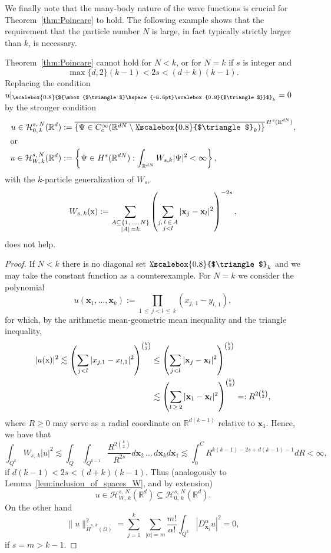 \documentclass[AHL, Unicode, longabstracts, published]{cedram}
\newcommand*\R {\mathbb{R}}
\newcommand\1{{\ensuremath {\mathds 1} }}
\newcommand{\bx}{\mathbf{x}}
\newcommand{\cH}{\mathcal{H}}
\newcommand{\sx}{\textup{x}}
\newcommand{\bDelta}{{\mbox{$\triangle$}\hspace{-8.6pt}\scalebox{0.8}{$\triangle$}}}
\newcommand{\scriptbDelta}{\scalebox{0.8}{$\bDelta$}}
\begin{document}
We finally note that the many-body nature of the wave functions is crucial for Theorem~\ref{thm:Poincare} to hold. The following example shows that the requirement that the particle number $N$ is large, in fact typically strictly larger than $k$, is necessary.

\begin{prop}\label{prop:counterex}
Theorem~\ref{thm:Poincare} cannot hold for $N < k$, or for $N = k$ if $s$ is integer and
\[
\max\{d,2\}(k-1) < 2s < (d+k)(k-1).
\]
Replacing the condition $u\rvert_{\scriptbDelta_k}=0$ by the stronger condition
\begin{align*}
u \in \cH_{0,\,k}^{s,\,N}(\R^d) &:= \overline{\left\{ \Psi \in C_c^\infty(\R^{dN} \setminus \bDelta_k) \right\} }^{\, H^s(\R^{dN})},
\\
\intertext{or}
u \in \cH_{W,\,k}^{s,\,N}(\R^d) &:= \left\{ \Psi \in H^s(\R^{dN}): \int_{\R^{dN}} W_{s,k} |\Psi|^2 < \infty \right\},
\end{align*}
with the $k$-particle generalization of $W_s$,
\[
W_{s,\,k}(\sx) := \sum_{\substack{A \subseteq \{1,\,\ldots,\,N\}\\|A|\,=k}} \left(\sum_{\substack{j,\,l\:\in\,A\\j<l}} |\bx_j-\bx_l|^2 \right)^{-2s},
\]
does not help.
\end{prop}


\begin{proof}
If $N < k$ there is no diagonal set $\bDelta_k$ and we may take the constant function as a counterexample. For $N = k$ we consider the polynomial
\[
u(\bx_1,\ldots,\bx_k) := \prod_{1\,\le\,j<l\,\le\,k} (x_{j,\,1} - y_{l,\,1}),
\]
for which, by the arithmetic mean-geometric mean inequality and the triangle inequality,
\begin{align*}
|u(\sx)|^2 \lesssim \left(\sum_{j<l} |x_{j,1}-x_{l,1}|^2 \right)^{\binom{k}{2}}
&\le \left(\sum_{j<l} |\bx_j-\bx_l|^2 \right)^{\binom{k}{2}}\\
&\lesssim \left(\sum_{l\,\geq\,2} |\bx_1-\bx_l|^2 \right)^{\binom{k}{2}}=: R^{2\binom{k}{2}},
\end{align*}
where $R \ge 0$ may serve as a radial coordinate on $\R^{d(k-1)}$ relative to $\bx_1$. Hence, we have that
\[
\int_{Q^k} W_{s,\,k} |u|^2
\lesssim \int_Q\,\int_{Q^{k-1}} \frac{R^{2\binom{k}{2}}}{R^{2s}} d\bx_2\,\ldots\,d\bx_k d\bx_1
\lesssim \int_0^C R^{k(k-1)-2s+d(k-1)-1} dR < \infty,
\]
if $d(k-1) < 2s < (d+k)(k-1)$. Thus (analogously to Lemma~\ref{lem:inclusion_of_spaces_W}, and by extension)
\[
u \in \cH_{W,\,k}^{s,\,N}(\R^d)
\subseteq \cH_{0,\,k}^{s,\,N}(\R^d).
\]
On the other hand
\[
\|u\|_{\dot{H}^{s,\,k}(\Omega)}^2 = \sum_{j=1}^k\;\sum_{|\alpha|=m} \frac{m!}{\alpha!} \int_{Q^k} \left|D^\alpha_{\bx_j} u\right|^2 = 0,
\]
if $s=m > k-1$.
\end{proof}
\end{document}
